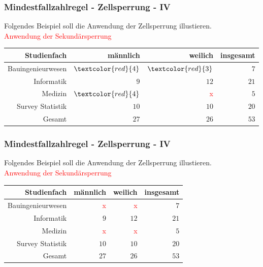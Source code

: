 \documentclass[aspectratio=169]{beamer}
\begin{document}
\begin{frame}
    \frametitle{Mindestfallzahlregel - Zellsperrung - IV}
    Folgendes Beispiel soll die Anwendung der Zellsperrung illustieren. \\
    \textcolor{red}{Anwendung der Sekundärsperrung}
    \begin{center}
        \begin{tabular}{ r r r r }
         \textbf{Studienfach} \vline & \textbf{männlich} & \textbf{weilich} & \textbf{insgesamt} \\ 
         \hline
         Bauingenieurwesen \vline & $\textcolor{red}{4}$ & $\textcolor{red}{3}$ & $7$ \\
         Informatik \vline & $9$ & $12$ & $21$ \\  
         Medizin \vline & $\textcolor{red}{4}$ & \textcolor{red}{x} & $5$ \\
         Survey Statistik \vline & $10$ & $10$ & $20$ \\
         \hline
         Gesamt \vline & $27$ & $26$ & $53$
        \end{tabular}
    \end{center}
\end{frame}


\begin{frame}
    \frametitle{Mindestfallzahlregel - Zellsperrung - IV}
    Folgendes Beispiel soll die Anwendung der Zellsperrung illustieren. \\
    \textcolor{red}{Anwendung der Sekundärsperrung}
    \begin{center}
        \begin{tabular}{ r r r r }
         \textbf{Studienfach} \vline & \textbf{männlich} & \textbf{weilich} & \textbf{insgesamt} \\ 
         \hline
         Bauingenieurwesen \vline & \textcolor{red}{x} & \textcolor{red}{x} & $7$ \\
         Informatik \vline & $9$ & $12$ & $21$ \\  
         Medizin \vline & \textcolor{red}{x} & \textcolor{red}{x} & $5$ \\
         Survey Statistik \vline & $10$ & $10$ & $20$ \\
         \hline
         Gesamt \vline & $27$ & $26$ & $53$
        \end{tabular}
    \end{center}
\end{frame}
\end{document}
